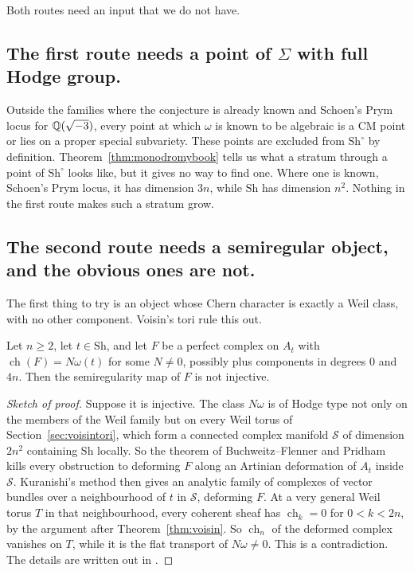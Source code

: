 Both routes need an input that we do not have.

\subsection*{The first route needs a point of $\Sigma$ with full Hodge group.}
Outside the families where the conjecture is already known and Schoen's
Prym locus for $\mathbb{Q}(\sqrt{-3})$, every point at which $\omega$ is known to
be algebraic is a CM point or lies on a proper special subvariety. These
points are excluded from $\mathrm{Sh}^{\circ}$ by definition.
Theorem~\ref{thm:monodromybook} tells us what a stratum through a point of
$\mathrm{Sh}^{\circ}$ looks like, but it gives no way to find one. Where one is
known, Schoen's Prym locus, it has dimension $3n$, while $\mathrm{Sh}$ has
dimension $n^{2}$. Nothing in the first route makes such a stratum grow.

\subsection*{The second route needs a semiregular object, and the obvious
ones are not.}
The first thing to try is an object whose Chern character is exactly a
Weil class, with no other component. Voisin's tori rule this out.

\begin{theorem}\label{thm:purefalse}
Let $n\ge2$, let $t\in\mathrm{Sh}$, and let $F$ be a perfect complex on
$A_{t}$ with $\operatorname{ch}(F)=N\omega(t)$ for some $N\ne0$, possibly
plus components in degrees $0$ and $4n$. Then the semiregularity map of $F$
is not injective.
\end{theorem}

\begin{proof}[Sketch of proof]
Suppose it is injective. The class $N\omega$ is of Hodge type not only on
the members of the Weil family but on every Weil torus of
Section~\ref{sec:voisintori}, which form a connected complex manifold
$\mathcal S$ of dimension $2n^{2}$ containing $\mathrm{Sh}$ locally. So the
theorem of Buchweitz--Flenner and Pridham \cite{BF03,Pri24} kills every
obstruction to deforming $F$ along an Artinian deformation of $A_{t}$
inside $\mathcal S$. Kuranishi's method then gives an analytic family of
complexes of vector bundles over a neighbourhood of $t$ in $\mathcal S$,
deforming $F$. At a very general Weil torus $T$ in that neighbourhood,
every coherent sheaf has $\operatorname{ch}_{k}=0$ for $0<k<2n$, by the
argument after Theorem~\ref{thm:voisin}. So $\operatorname{ch}_{n}$ of the
deformed complex vanishes on $T$, while it is the flat transport of
$N\omega\ne0$. This is a contradiction. The details are written out in
\cite{BhH8}.
\end{proof}

